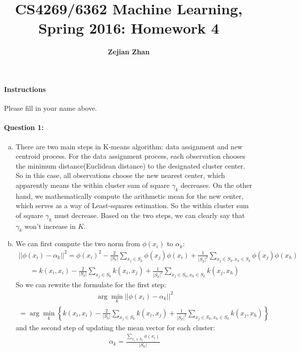 \documentclass[letterpaper,11pt]{article}
\title{CS4269/6362 Machine Learning, Spring 2016: Homework 4}
\date{}
\author{\bf Zejian Zhan}
\begin{document}
\maketitle

\paragraph*{Instructions} Please fill in your name above.

\paragraph{Question 1:}
\begin{enumerate}[(a)]
\item 
There are two main steps in K-means algorithm: data assignment and new centroid process. For the data assignment process, each observation chooses the minimum distance(Euclidean distance) to the designated cluster center. So in this case, all observations choose the new nearest center, which apparently means the within cluster sum of square $\gamma_k$ decreases. On the other hand, we mathematically compute the arithmetic mean for the new center, which serves as a way of Least-squares estimation. So the within cluster sum of square $\gamma_k$ must decrease. Based on the two steps, we can clearly say that $\gamma_k$ won't increase in $K$.
\item
We can first compute the two norm from $\phi(x_i)$ to $\alpha_k$:
\begin{eqnarray}
||\phi(x_i)-\alpha_k||^2=\phi(x_i)^2-\frac{2}{|S_k|}\sum_{x_j \in S_k}{\phi(x_j)\phi(x_i)}+\frac{1}{|S_k|^2}\sum_{x_j\in S_k,x_h\in S_k}{\phi(x_j)\phi(x_h)} 
\end{eqnarray}
\begin{eqnarray}
= k(x_i,x_i)-\frac{2}{|S_k|}\sum_{x_j\in S_k}{k(x_i,x_j)}+\frac{1}{|S_k|^2}\sum_{x_j\in S_k,x_h\in S_k}{k(x_j,x_h)}
\end{eqnarray}
So we can rewrite the formulate for the first step:
\begin{eqnarray}
\arg\min_{k}{||\phi(x_i)-\alpha_k||^2}
\end{eqnarray}
\begin{eqnarray}
= \arg\min_{k}{\left\{ k(x_i,x_i)-\frac{2}{|S_k|}\sum_{x_j\in S_k}{k(x_i,x_j)}+\frac{1}{|S_k|^2}\sum_{x_j\in S_k,x_h\in S_k}{k(x_j,x_h)}\right\}}
\end{eqnarray}
and the second step of updating the mean vector for each cluster:
\begin{eqnarray}
\alpha_k=\frac{\sum_{x_i\in S_k}{\phi(x_i)}}{|S_k|}
\end{eqnarray}
\end{enumerate}
\end{document}
